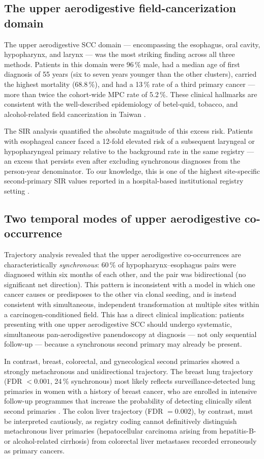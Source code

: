 \documentclass[review,12pt]{elsarticle}
\begin{document}
\subsection{The upper aerodigestive field-cancerization domain}
The upper aerodigestive SCC domain --- encompassing the esophagus, oral cavity,
hypopharynx, and larynx --- was the most striking finding across all three
methods. Patients in this domain were 96\,\% male, had a median age of first
diagnosis of 55 years (six to seven years younger than the other clusters),
carried the highest mortality (68.8\,\%), and had a 13\,\% rate of a third
primary cancer --- more than twice the cohort-wide MPC rate of 5.2\,\%. These
clinical hallmarks are consistent with the well-described epidemiology of
betel-quid, tobacco, and alcohol-related field cancerization in Taiwan
\cite{Lee2005, Curtius2018}.

The SIR analysis quantified the absolute magnitude of this excess risk. Patients
with esophageal cancer faced a 12-fold elevated risk of a subsequent laryngeal or
hypopharyngeal primary relative to the background rate in the same registry ---
an excess that persists even after excluding synchronous diagnoses from the
person-year denominator. To our knowledge, this is one of the highest
site-specific second-primary SIR values reported in a hospital-based institutional
registry setting \cite{Chuang2008, Morris2011}.

\subsection{Two temporal modes of upper aerodigestive co-occurrence}
Trajectory analysis revealed that the upper aerodigestive co-occurrences are
characteristically \textit{synchronous}: 60\,\% of hypopharynx--esophagus pairs
were diagnosed within six months of each other, and the pair was
bidirectional (no significant net direction). This pattern is inconsistent with
a model in which one cancer causes or predisposes to the other via clonal
seeding, and is instead consistent with simultaneous, independent transformation
at multiple sites within a carcinogen-conditioned field. This has a direct
clinical implication: patients presenting with one upper aerodigestive SCC should
undergo systematic, simultaneous pan-aerodigestive panendoscopy at diagnosis ---
not only sequential follow-up --- because a synchronous second primary may
already be present.

In contrast, breast, colorectal, and gynecological second primaries showed a
strongly metachronous and unidirectional trajectory. The breast\,\textrightarrow\,lung
trajectory (FDR $< 0.001$, 24\,\% synchronous) most likely reflects
surveillance-detected lung primaries in women with a history of breast cancer,
who are enrolled in intensive follow-up programmes that increase the probability
of detecting clinically silent second primaries \cite{Vogt2017}. The
colon\,\textrightarrow\,liver trajectory (FDR $= 0.002$), by contrast, must be
interpreted cautiously, as registry coding cannot definitively distinguish
metachronous liver primaries (hepatocellular carcinoma arising from hepatitis-B-
or alcohol-related cirrhosis) from colorectal liver metastases recorded
erroneously as primary cancers.
\end{document}

